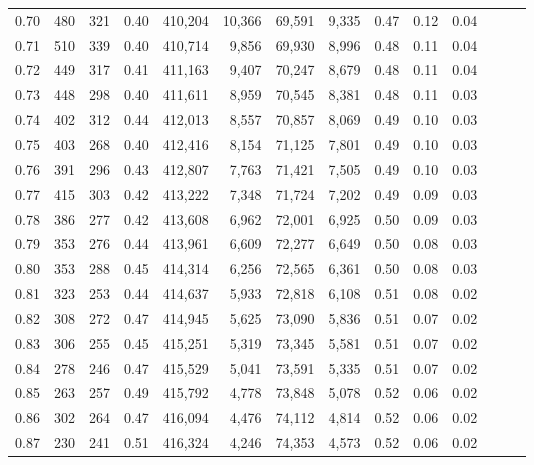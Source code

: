 \begin{tabular}{rrrrrrrrrrrrrr}
0.70 &     480 &    321 &  0.40 &  410,204 &   10,366 &  69,591 &   9,335 &  0.47 &  0.12 &      0.04 \\
0.71 &     510 &    339 &  0.40 &  410,714 &    9,856 &  69,930 &   8,996 &  0.48 &  0.11 &      0.04 \\
0.72 &     449 &    317 &  0.41 &  411,163 &    9,407 &  70,247 &   8,679 &  0.48 &  0.11 &      0.04 \\
0.73 &     448 &    298 &  0.40 &  411,611 &    8,959 &  70,545 &   8,381 &  0.48 &  0.11 &      0.03 \\
0.74 &     402 &    312 &  0.44 &  412,013 &    8,557 &  70,857 &   8,069 &  0.49 &  0.10 &      0.03 \\
0.75 &     403 &    268 &  0.40 &  412,416 &    8,154 &  71,125 &   7,801 &  0.49 &  0.10 &      0.03 \\
0.76 &     391 &    296 &  0.43 &  412,807 &    7,763 &  71,421 &   7,505 &  0.49 &  0.10 &      0.03 \\
0.77 &     415 &    303 &  0.42 &  413,222 &    7,348 &  71,724 &   7,202 &  0.49 &  0.09 &      0.03 \\
0.78 &     386 &    277 &  0.42 &  413,608 &    6,962 &  72,001 &   6,925 &  0.50 &  0.09 &      0.03 \\
0.79 &     353 &    276 &  0.44 &  413,961 &    6,609 &  72,277 &   6,649 &  0.50 &  0.08 &      0.03 \\
0.80 &     353 &    288 &  0.45 &  414,314 &    6,256 &  72,565 &   6,361 &  0.50 &  0.08 &      0.03 \\
0.81 &     323 &    253 &  0.44 &  414,637 &    5,933 &  72,818 &   6,108 &  0.51 &  0.08 &      0.02 \\
0.82 &     308 &    272 &  0.47 &  414,945 &    5,625 &  73,090 &   5,836 &  0.51 &  0.07 &      0.02 \\
0.83 &     306 &    255 &  0.45 &  415,251 &    5,319 &  73,345 &   5,581 &  0.51 &  0.07 &      0.02 \\
0.84 &     278 &    246 &  0.47 &  415,529 &    5,041 &  73,591 &   5,335 &  0.51 &  0.07 &      0.02 \\
0.85 &     263 &    257 &  0.49 &  415,792 &    4,778 &  73,848 &   5,078 &  0.52 &  0.06 &      0.02 \\
0.86 &     302 &    264 &  0.47 &  416,094 &    4,476 &  74,112 &   4,814 &  0.52 &  0.06 &      0.02 \\
0.87 &     230 &    241 &  0.51 &  416,324 &    4,246 &  74,353 &   4,573 &  0.52 &  0.06 &      0.02 \\

\end{tabular}

